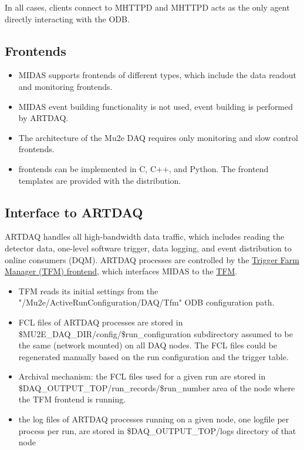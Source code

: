 In all cases, clients connect to MHTTPD and MHTTPD acts as
the only agent directly interacting with the ODB.

\subsection{Frontends}

\begin{itemize}
\item 
  MIDAS supports frontends of different types, which include the data readout and monitoring
  frontends.
\item 
  MIDAS event building functionality is not used, event building is performed by ARTDAQ.
\item 
  The architecture of the Mu2e DAQ requires only monitoring and slow control frontends.
\item
  frontends can be implemented in C, C++, and Python. The frontend templates are provided
  with the distribution.
\end{itemize}


\subsection{Interface to ARTDAQ}
ARTDAQ handles all high-bandwidth data traffic, which includes reading the
detector data, one-level software trigger, data logging, and event distribution
to online consumers (DQM).
%
ARTDAQ processes are controlled by the  \href{https://github.com/pavel1murat/frontends/blob/main/tfm_frontend/tfm_launch_fe.py}
{\blue Trigger Farm Manager (TFM) frontend}, which interfaces MIDAS to the
\href{https://github.com/pavel1murat/tfm/blob/main/rc/control/farm_manager.py}{\blue TFM}.

\begin{itemize}
\item 
  TFM reads its initial settings from the "/Mu2e/ActiveRunConfiguration/DAQ/Tfm"
  ODB configuration path.
\item
  FCL files of ARTDAQ processes are stored in \$MU2E\_DAQ\_DIR/config/\$run\_configuration
  subdirectory assumed to be the same (network mounted) on all DAQ nodes.
  The FCL files could be regenerated manually based on the run configuration and the trigger table.
\item
  Archival mechanism: the FCL files used for a given run are stored in \\
  \$DAQ\_OUTPUT\_TOP/run\_records/\$run\_number area of the node where the TFM frontend is running.
\item
  the log files of ARTDAQ processes running on a given node, one logfile per process per run,
  are stored in \$DAQ\_OUTPUT\_TOP/logs directory of that node
\end{itemize}


